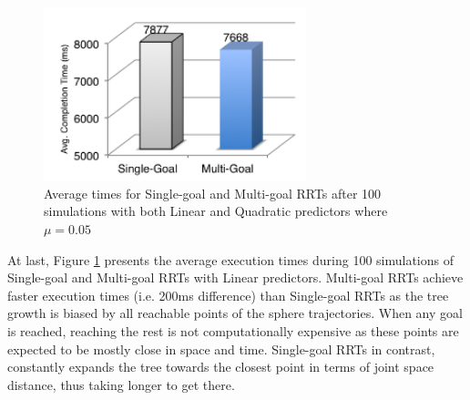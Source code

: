 \documentclass[letterpaper, 10 pt, conference]{ieeeconf}  %
\begin{document}
\begin{figure}
        \centering
        \includegraphics[width=3in]{fig/runtimes}
        \caption{Average times for Single-goal and
        Multi-goal RRTs after 100 simulations with both Linear and
      Quadratic predictors where $\mu = 0.05$}\label{fig:runtimes}
\end{figure}

At last, Figure \ref{fig:runtimes} presents the average execution times
during 100 simulations of Single-goal and Multi-goal RRTs with Linear
predictors. Multi-goal RRTs achieve faster execution times (i.e. 200ms
difference) than Single-goal RRTs as the tree growth is biased by all
reachable points of the sphere trajectories. When any goal is reached,
reaching the rest is not computationally expensive as these points are
expected to be mostly close in space and time. Single-goal RRTs in
contrast, constantly expands the tree towards the closest point in terms
of joint space distance, thus taking longer to get there.
\end{document}
